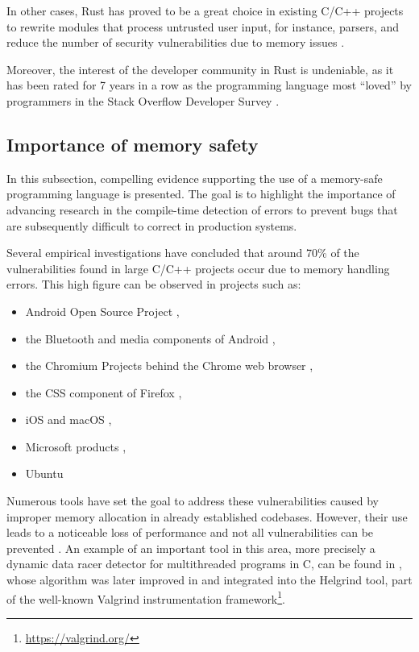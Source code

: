 \documentclass[../../Thesis.tex]{subfiles}
\begin{document}
In other cases, Rust has proved to be a great choice in existing C/C++ projects to rewrite modules
that process untrusted user input, for instance, parsers,
and reduce the number of security vulnerabilities due to memory issues \cite{chifflier2017writing}.

Moreover, the interest of the developer community in Rust is undeniable,
as it has been rated for 7 years in a row as the programming language most ``loved'' by programmers
in the Stack Overflow Developer Survey \cite{so-survey2022}.

\subsection{Importance of memory safety}

In this subsection, compelling evidence supporting
the use of a memory-safe programming language is presented.
The goal is to highlight the importance of advancing research in the compile-time detection of errors
to prevent bugs that are subsequently difficult to correct in production systems.

Several empirical investigations have concluded that around 70\% of the vulnerabilities
found in large C/C++ projects occur due to memory handling errors.
This high figure can be observed in projects such as:

\begin{itemize}
    \item Android Open Source Project \cite{memory-bugs-android},
    \item the Bluetooth and media components of Android \cite{memory-bugs-android-media-bluetooth},
    \item the Chromium Projects behind the Chrome web browser \cite{memory-bugs-chrome},
    \item the CSS component of Firefox \cite{memory-bugs-firefox},
    \item iOS and macOS \cite{memory-bugs-ios-macos},
    \item Microsoft products \cite{miller-security-microsoft2019, memory-bugs-microsoft},
    \item Ubuntu \cite{memory-bugs-ubuntu}
\end{itemize}

Numerous tools have set the goal to address these vulnerabilities
caused by improper memory allocation in already established codebases.
However, their use leads to a noticeable loss of performance and
not all vulnerabilities can be prevented \cite{szekeres2013sok}.
An example of an important tool in this area, more precisely
a dynamic data racer detector for multithreaded programs in C,
can be found in \cite{savage1997eraser},
whose algorithm was later improved in \cite{jannesari2009helgrind+} and
integrated into the Helgrind tool, part of the well-known
Valgrind instrumentation framework\footnote{\url{https://valgrind.org/}}.
\end{document}
